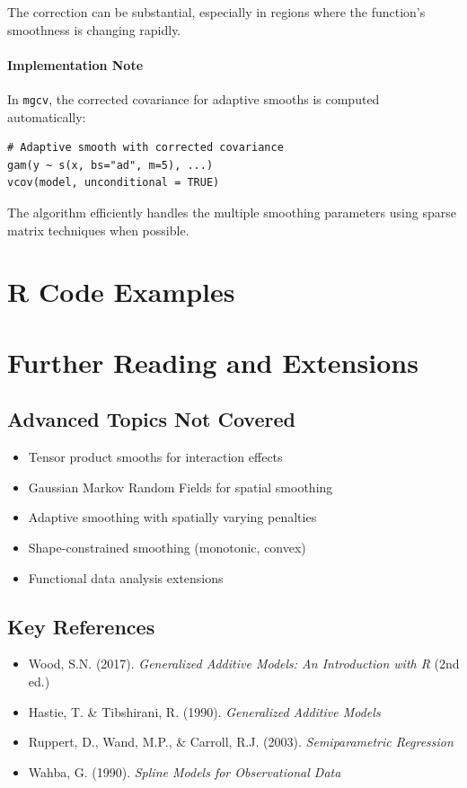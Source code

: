 \documentclass[12pt]{article}
\begin{document}
The correction can be substantial, especially in regions where the function's smoothness is changing rapidly.

\paragraph{Implementation Note}
In \texttt{mgcv}, the corrected covariance for adaptive smooths is computed automatically:
\begin{verbatim}
# Adaptive smooth with corrected covariance
gam(y ~ s(x, bs="ad", m=5), ...)
vcov(model, unconditional = TRUE)
\end{verbatim}

The algorithm efficiently handles the multiple smoothing parameters using sparse matrix techniques when possible.

\section{R Code Examples}



\section{Further Reading and Extensions}

\subsection{Advanced Topics Not Covered}
\begin{itemize}
    \item Tensor product smooths for interaction effects
    \item Gaussian Markov Random Fields for spatial smoothing
    \item Adaptive smoothing with spatially varying penalties
    \item Shape-constrained smoothing (monotonic, convex)
    \item Functional data analysis extensions
\end{itemize}

\subsection{Key References}
\begin{itemize}
    \item Wood, S.N. (2017). \textit{Generalized Additive Models: An Introduction with R} (2nd ed.)
    \item Hastie, T. \& Tibshirani, R. (1990). \textit{Generalized Additive Models}
    \item Ruppert, D., Wand, M.P., \& Carroll, R.J. (2003). \textit{Semiparametric Regression}
    \item Wahba, G. (1990). \textit{Spline Models for Observational Data}
\end{itemize}
\end{document}

